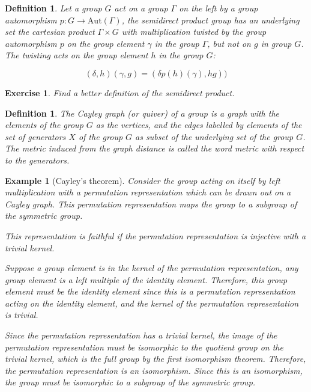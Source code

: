 \documentclass{tufte-book}
\newtheorem{definition}[theorem]{Definition}
\newtheorem{example}[theorem]{Example}
\newtheorem{exercise}[theorem]{Exercise}
\begin{document}
\begin{definition}
  Let a group $G$ act on a group $\Gamma$ on the left by a group automorphism $p : G \rightarrow \mathrm{Aut}(\Gamma)$, the semidirect product group has an underlying set the cartesian product $\Gamma \times G$ with multiplication twisted by the group automorphism $p$ on the group element $\gamma$ in the group $\Gamma$, but not on $g$ in group $G$. The twisting acts on the group element $h$ in the group $G$:

  \begin{equation}
    (\delta, h)(\gamma, g)
    = (\delta p(h)(\gamma), hg))
  \end{equation}
\end{definition}

\begin{exercise}
  Find a better definition of the semidirect product.
\end{exercise}

\begin{definition}
  The Cayley graph (or quiver) of a group is a graph with the elements of the group $G$ as the vertices, and the edges labelled by elements of the set of generators $X$ of the group $G$ as subset of the underlying set of the group $G$. The metric induced from the graph distance is called the word metric with respect to the generators.
\end{definition}

\begin{example}[Cayley's theorem]
  Consider the group acting on itself by left multiplication with a permutation representation which can be drawn out on a Cayley graph. 
  This permutation representation maps the group to a subgroup of the symmetric group.

  This representation is faithful if the permutation representation is injective with a trivial kernel.
  
  Suppose a group element is in the kernel of the permutation representation, any group element is a left multiple of the identity element. Therefore, this group element must be the identity element since this is a permutation representation acting on the identity element, and the kernel of the permutation representation is trivial.

  Since the permutation representation has a trivial kernel, the image of the permutation representation must be isomorphic to the quotient group on the trivial kernel, which is the full group by the first isomorphism theorem. Therefore, the permutation representation is an isomorphism. Since this is an isomorphism, the group must be isomorphic to a subgroup of the symmetric group. 
\end{example}
\end{document}

